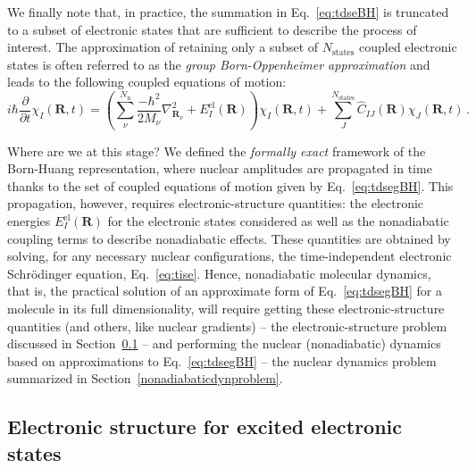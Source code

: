 \documentclass[9pt,bestpractices,pubversion]{livecoms}
\begin{document}
We finally note that, in practice, the summation in Eq.~\eqref{eq:tdseBH} is truncated to a subset of electronic states that are sufficient to describe the process of interest. The approximation of retaining only a subset of $N_\text{states}$ coupled electronic states is often referred to as the \textit{group Born-Oppenheimer approximation}\cite{conicalintersection2004} and leads to the following coupled equations of motion:
\begin{equation}
i\hbar\frac{\partial}{\partial t} \chi_I(\mathbf{R},t)  = \left(\sum_\nu^{N_{\text{n}}}\frac{-\hbar^2}{2M_\nu} \nabla_{\mathbf{R}_\nu}^2 + E^{\text{el}}_{I}(\mathbf{R})\right)\chi_I(\mathbf{R},t) + \sum_J^{N_{\text{states}}} \hat{C}_{IJ}(\mathbf{R}) \chi_J(\mathbf{R},t) \, .
\label{eq:tdsegBH}
\end{equation}

Where are we at this stage? We defined the \textit{formally exact} framework of the Born-Huang representation, where nuclear amplitudes are propagated in time thanks to the set of coupled equations of motion given by Eq.~\eqref{eq:tdsegBH}. This propagation, however, requires electronic-structure quantities: the electronic energies $E^{\text{el}}_{I}(\mathbf{R})$ for the electronic states considered as well as the nonadiabatic coupling terms to describe nonadiabatic effects. These quantities are obtained by solving, for any necessary nuclear configurations, the time-independent electronic Schr\"{o}dinger equation, Eq.~\eqref{eq:tise}. Hence, nonadiabatic molecular dynamics, that is, the practical solution of an approximate form of Eq.~\eqref{eq:tdsegBH} for a molecule in its full dimensionality, will require getting these electronic-structure quantities (and others, like nuclear gradients) -- the electronic-structure problem discussed in Section~\ref{elecstructproblem} -- and performing the nuclear (nonadiabatic) dynamics based on approximations to Eq.~\eqref{eq:tdsegBH} -- the nuclear dynamics problem summarized in Section~\ref{nonadiabaticdynproblem}.


\subsection{Electronic structure for excited electronic states}
\label{elecstructproblem}
\end{document}
